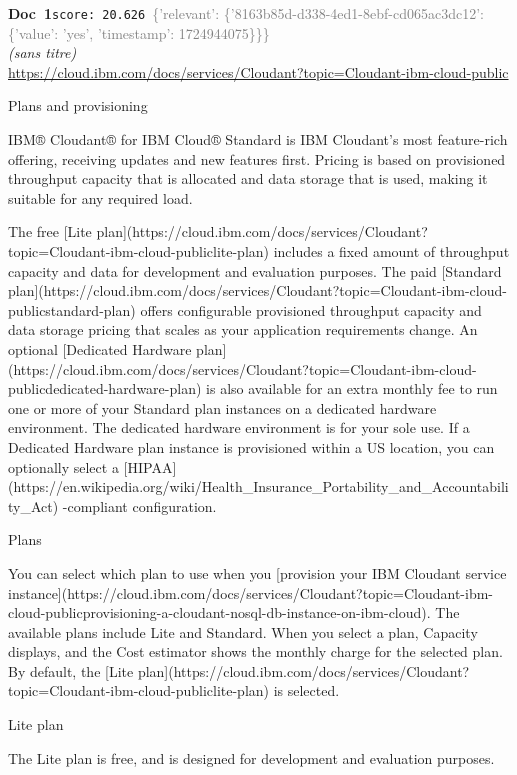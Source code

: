 \documentclass[a4paper,11pt]{article}
\begin{document}
\begin{docenv}
{\footnotesize\textcolor{doccolor}{\textbf{Doc~1}}}\hfill{\tiny\texttt{score:~20.626}}\ {\tiny\textcolor{gray}{\{'relevant': \{'8163b85d-d338-4ed1-8ebf-cd065ac3dc12': \{'value': 'yes', 'timestamp': 1724944075\}\}\}}}\\[3pt]
{\small\textit{(sans titre)}}\\[2pt]
{\tiny\url{https://cloud.ibm.com/docs/services/Cloudant?topic=Cloudant-ibm-cloud-public}}\\[4pt]
{\footnotesize 
Plans and provisioning 

IBM® Cloudant® for IBM Cloud® Standard is IBM Cloudant's most feature-rich offering, receiving updates and new features first. Pricing is based on provisioned throughput capacity that is allocated and data storage that is used, making it suitable for any required load.

The free [Lite plan](https://cloud.ibm.com/docs/services/Cloudant?topic=Cloudant-ibm-cloud-publiclite-plan) includes a fixed amount of throughput capacity and data for development and evaluation purposes. The paid [Standard plan](https://cloud.ibm.com/docs/services/Cloudant?topic=Cloudant-ibm-cloud-publicstandard-plan) offers configurable provisioned throughput capacity and data storage pricing that scales as your application requirements change. An optional [Dedicated Hardware plan](https://cloud.ibm.com/docs/services/Cloudant?topic=Cloudant-ibm-cloud-publicdedicated-hardware-plan) is also available for an extra monthly fee to run one or more of your Standard plan instances on a dedicated hardware environment. The dedicated hardware environment is for your sole use. If a Dedicated Hardware plan instance is provisioned within a US location, you can optionally select a [HIPAA](https://en.wikipedia.org/wiki/Health\_Insurance\_Portability\_and\_Accountability\_Act) -compliant configuration.



 Plans 

You can select which plan to use when you [provision your IBM Cloudant service instance](https://cloud.ibm.com/docs/services/Cloudant?topic=Cloudant-ibm-cloud-publicprovisioning-a-cloudant-nosql-db-instance-on-ibm-cloud). The available plans include Lite and Standard. When you select a plan, Capacity displays, and the Cost estimator shows the monthly charge for the selected plan. By default, the [Lite plan](https://cloud.ibm.com/docs/services/Cloudant?topic=Cloudant-ibm-cloud-publiclite-plan) is selected.



 Lite plan 

The Lite plan is free, and is designed for development and evaluation purposes.}
\end{docenv}
\end{document}
